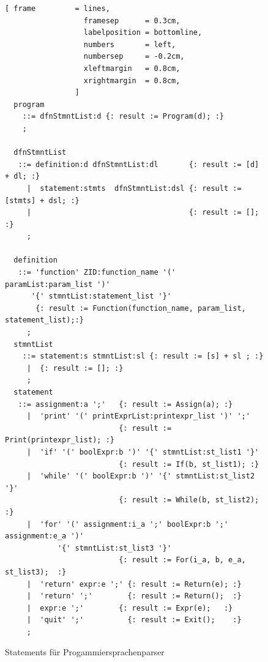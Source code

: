 \begin{figure}[!ht]

\begin{Verbatim}[ frame         = lines, 
                  framesep      = 0.3cm, 
                  labelposition = bottomline,
                  numbers       = left,
                  numbersep     = -0.2cm,
                  xleftmargin   = 0.8cm,
                  xrightmargin  = 0.8cm,
                ]
  program 
    ::= dfnStmntList:d {: result := Program(d); :}
    ;

  dfnStmntList 
   ::= definition:d dfnStmntList:dl       {: result := [d] + dl; :}
     |  statement:stmts  dfnStmntList:dsl {: result := [stmts] + dsl; :}
     |                                    {: result := []; :}
     ;

  definition
   ::= 'function' ZID:function_name '(' paramList:param_list ')' 
      '{' stmntList:statement_list '}'
       {: result := Function(function_name, param_list, statement_list);:}
     ; 
  stmntList
    ::= statement:s stmntList:sl {: result := [s] + sl ; :}
     |  {: result := []; :}
     ;
  statement 
   ::= assignment:a ';'   {: result := Assign(a); :}    
     |  'print' '(' printExprList:printexpr_list ')' ';'      
                          {: result := Print(printexpr_list); :}
     |  'if' '(' boolExpr:b ')' '{' stmntList:st_list1 '}'    
                          {: result := If(b, st_list1); :}
     |  'while' '(' boolExpr:b ')' '{' stmntList:st_list2 '}' 
                          {: result := While(b, st_list2); :}
     |  'for' '(' assignment:i_a ';' boolExpr:b ';' assignment:e_a ')' 
		    '{' stmntList:st_list3 '}' 
                          {: result := For(i_a, b, e_a, st_list3);  :}
     |  'return' expr:e ';' {: result := Return(e); :}
     |  'return' ';'        {: result := Return();  :}
     |  expr:e ';'        {: result := Expr(e);   :}      
     |  'quit' ';'          {: result := Exit();    :}
     ;
\end{Verbatim}
\caption{Statements für Progammiersprachenparser}
\label{fig:example_interpreter_grammar_statements}
\end{figure}
